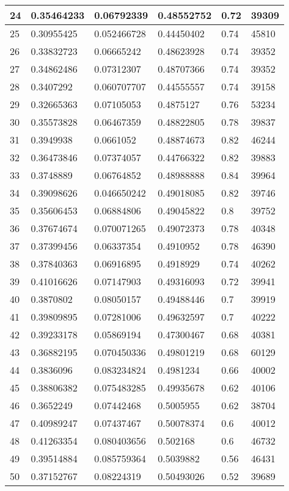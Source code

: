 \begin{longtable}{|l|l|l|l|l|l|}
24 & 0.35464233 & 0.06792339 & 0.48552752 & 0.72 & 39309 \\ \hline 
25 & 0.30955425 & 0.052466728 & 0.44450402 & 0.74 & 45810 \\ \hline 
26 & 0.33832723 & 0.06665242 & 0.48623928 & 0.74 & 39352 \\ \hline 
27 & 0.34862486 & 0.07312307 & 0.48707366 & 0.74 & 39352 \\ \hline 
28 & 0.3407292 & 0.060707707 & 0.44555557 & 0.74 & 39158 \\ \hline 
29 & 0.32665363 & 0.07105053 & 0.4875127 & 0.76 & 53234 \\ \hline 
30 & 0.35573828 & 0.06467359 & 0.48822805 & 0.78 & 39837 \\ \hline 
31 & 0.3949938 & 0.0661052 & 0.48874673 & 0.82 & 46244 \\ \hline 
32 & 0.36473846 & 0.07374057 & 0.44766322 & 0.82 & 39883 \\ \hline 
33 & 0.3748889 & 0.06764852 & 0.48988888 & 0.84 & 39964 \\ \hline 
34 & 0.39098626 & 0.046650242 & 0.49018085 & 0.82 & 39746 \\ \hline 
35 & 0.35606453 & 0.06884806 & 0.49045822 & 0.8 & 39752 \\ \hline 
36 & 0.37674674 & 0.070071265 & 0.49072373 & 0.78 & 40348 \\ \hline 
37 & 0.37399456 & 0.06337354 & 0.4910952 & 0.78 & 46390 \\ \hline 
38 & 0.37840363 & 0.06916895 & 0.4918929 & 0.74 & 40262 \\ \hline 
39 & 0.41016626 & 0.07147903 & 0.49316093 & 0.72 & 39941 \\ \hline 
40 & 0.3870802 & 0.08050157 & 0.49488446 & 0.7 & 39919 \\ \hline 
41 & 0.39809895 & 0.07281006 & 0.49632597 & 0.7 & 40222 \\ \hline 
42 & 0.39233178 & 0.05869194 & 0.47300467 & 0.68 & 40381 \\ \hline 
43 & 0.36882195 & 0.070450336 & 0.49801219 & 0.68 & 60129 \\ \hline 
44 & 0.3836096 & 0.083234824 & 0.4981234 & 0.66 & 40002 \\ \hline 
45 & 0.38806382 & 0.075483285 & 0.49935678 & 0.62 & 40106 \\ \hline 
46 & 0.3652249 & 0.07442468 & 0.5005955 & 0.62 & 38704 \\ \hline 
47 & 0.40989247 & 0.07437467 & 0.50078374 & 0.6 & 40012 \\ \hline 
48 & 0.41263354 & 0.080403656 & 0.502168 & 0.6 & 46732 \\ \hline 
49 & 0.39514884 & 0.085759364 & 0.5039882 & 0.56 & 46431 \\ \hline 
50 & 0.37152767 & 0.08224319 & 0.50493026 & 0.52 & 39689 \\ \hline 
\end{longtable}